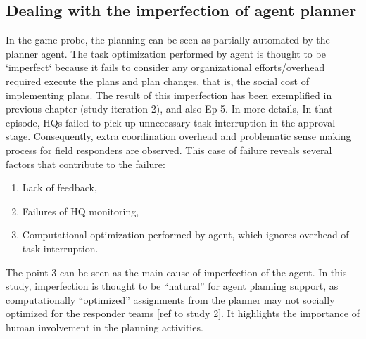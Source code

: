 \subsection{Dealing with the imperfection of agent planner}\label{sec:huilimperfection}

In the game probe, the planning can be seen as partially automated by the planner agent. The task optimization performed by agent is thought to be `imperfect` because it fails to consider any organizational efforts/overhead required execute the plans and plan changes, that is, the social cost of implementing plans. The result of this imperfection has been exemplified in previous chapter (study iteration 2), and also Ep 5. In more details, In that episode, HQs failed to pick up unnecessary task interruption in the approval stage. Consequently, extra coordination overhead and problematic sense making process for field responders are observed. This case of failure reveals several factors that contribute to the failure: \\

\begin{enumerate}
\item Lack of feedback, \\
\item Failures of HQ monitoring, \\
\item Computational optimization performed by agent, which ignores overhead of task interruption. \\
\end{enumerate}

The point 3 can be seen as the main cause of imperfection of the agent. In this study, imperfection is thought to be ``natural'' for agent planning support, as computationally ``optimized'' assignments from the planner may not socially optimized for the responder teams [ref to study 2]. It highlights the importance of human involvement in the planning activities. \\

